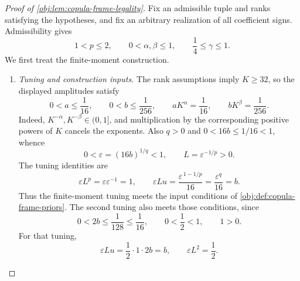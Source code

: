 \documentclass[11pt]{article}
\begin{document}
\begin{proof}[Proof of \cref{obj:lem:copula-frame-legality}]
Fix an admissible tuple and ranks satisfying the hypotheses, and fix an arbitrary realization of all coefficient signs. Admissibility gives
\[
1<p\le2,\qquad
0<\alpha,\beta\le1,\qquad
\frac14\le\gamma\le1.
\]
We first treat the finite-moment construction.

\begin{enumerate}
\item \textit{Tuning and construction inputs.}
The rank assumptions imply \(K\ge32\), so the displayed amplitudes satisfy
\[
0<a\le\frac1{16},\qquad
0<b\le\frac1{256},\qquad
aK^\alpha=\frac1{16},\qquad
bK^\beta=\frac1{256}.
\]
Indeed, \(K^{-\alpha},K^{-\beta}\in(0,1]\), and multiplication by the corresponding positive powers of \(K\) cancels the exponents. Also \(q>0\) and \(0<16b\le1/16<1\), whence
\[
0<\varepsilon=(16b)^{1/q}<1,\qquad
L=\varepsilon^{-1/p}>0.
\]
The tuning identities are
\[
\varepsilon L^p
=\varepsilon\varepsilon^{-1}=1,
\qquad
\varepsilon Lu
=\frac{\varepsilon^{\,1-1/p}}{16}
=\frac{\varepsilon^q}{16}
=b.
\]
Thus the finite-moment tuning meets the input conditions of
\cref{obj:def:copula-frame-priors}. The second tuning also meets those conditions, since
\[
0<2b\le\frac1{128}\le\frac1{16},
\qquad
0<\frac12<1,\qquad 1>0.
\]
For that tuning,
\[
\varepsilon Lu=\frac12\cdot1\cdot2b=b,
\qquad
\varepsilon L^2=\frac12.
\]


\end{enumerate}
\end{proof}
\end{document}
